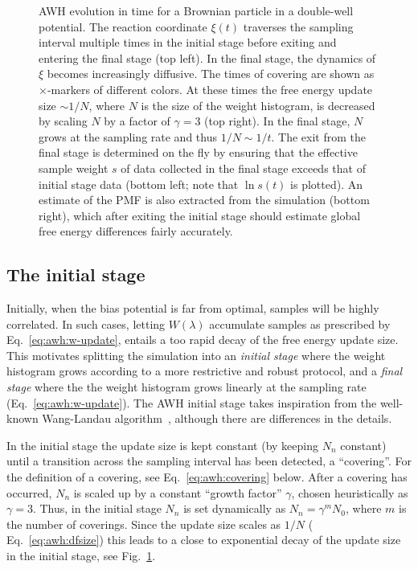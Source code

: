 \begin{figure}
{}
\caption{AWH evolution in time for a Brownian particle in a double-well potential.
The reaction coordinate $\xi(t)$ traverses the sampling interval multiple times in the initial stage before exiting and entering the final stage (top left).
In the final stage, the dynamics of $\xi$ becomes increasingly diffusive.
The times of covering are shown as $\times$-markers of different colors.
At these times the free energy update size $\sim 1/N$, where $N$ is the size of the  weight histogram,
is decreased by scaling  $N$ by a factor of $\gamma=3$ (top right).
In the final stage,  $N$ grows at the sampling rate and thus $1/N\sim1/t$.
The exit from the final stage is determined on the fly by ensuring that the effective sample weight $s$ of data collected in the final stage
exceeds that of initial stage data (bottom left; note that $\ln s(t)$ is plotted).
An estimate of the PMF is also extracted from the simulation (bottom right), which after exiting the initial stage should estimate global free energy differences fairly accurately.
}
\label{fig:awh:bias-evolution}
\end{figure}

\subsection{The initial stage}\label{sec:awh:initial-stage}
Initially, when the bias potential is far from optimal,
samples will be highly correlated. 
In such cases, 
letting $W(\lambda)$  accumulate samples as prescribed by Eq.~\ref{eq:awh:w-update},
entails a too rapid decay of the free energy update size.
This motivates splitting the simulation into an \emph{initial stage}
where the weight histogram grows according to a more restrictive and robust protocol,
and a \emph{final stage} where the the weight histogram grows linearly at the sampling rate (Eq.~\ref{eq:awh:w-update}).
The AWH  initial stage takes inspiration from the well-known Wang-Landau algorithm~\cite{wang2001efficient}, 
although there are differences in the details.

In the initial stage the update size is kept constant (by keeping $N_n$ constant) until a transition across the sampling interval has been detected,
a ``covering''. For the definition of a covering, see Eq.~\ref{eq:awh:covering} below.
After a covering has occurred, $N_n$ is scaled up by a constant ``growth factor'' $\gamma$, chosen heuristically as $\gamma=3$.
Thus, in the initial stage 
$N_n$ is set dynamically as
$N_{n} = \gamma^{m} N_0$,
where $m$ is the number of coverings.
Since the update size scales as $1/N$ ( Eq.~\ref{eq:awh:dfsize})
this leads to a close to exponential decay of the update size in the initial stage,
see Fig.~\ref{fig:awh:bias-evolution}.

